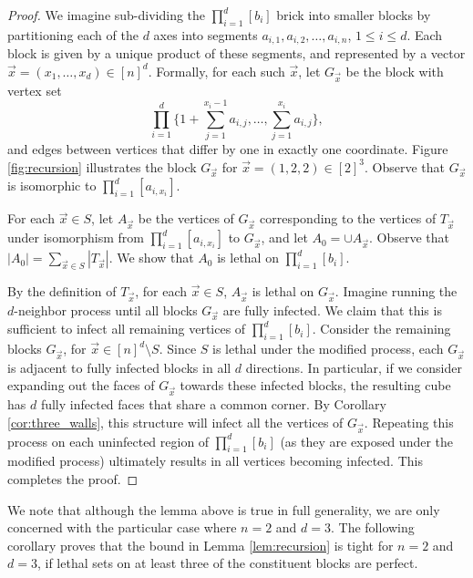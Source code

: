 \begin{proof}
We imagine sub-dividing the $\prod_{i=1}^d [b_{i}]$ brick into smaller blocks by partitioning each of the $d$ axes into segments $a_{i,1}, a_{i,2}, \dots, a_{i,n}$, $1 \leq i \leq d$. Each block is given by a unique product of these segments, and represented by a vector $\vec{x} = (x_1, \dots, x_d) \in [n]^d$. Formally, for each such $\vec{x}$, let $G_{\vec{x}}$ be the block with vertex set
$$\prod_{i=1}^d \{1+ \sum_{j=1}^{x_i -1}a_{i,j}, \dots, \sum_{j=1}^{x_i}a_{i,j} \},$$
and edges between vertices that differ by one in exactly one coordinate. Figure \ref{fig:recursion} illustrates the block $G_{\vec{x}}$ for $\vec{x} = (1,2,2) \in [2]^3$. Observe that $G_{\vec{x}}$ is isomorphic to $\prod_{i=1}^d [a_{i,x_i}]$.

For each $\vec{x} \in S$, let $A_{\vec{x}}$ be the vertices of $G_{\vec{x}}$ corresponding to the vertices of $T_{\vec{x}}$ under isomorphism from $\prod_{i=1}^d [a_{i,x_i}]$ to $G_{\vec{x}}$, and let $A_0 = \cup A_{\vec{x}}$. Observe that $|A_0| = \sum_{\vec{x} \in S} |T_{\vec{x}}|$. We show that $A_0$ is lethal on $\prod_{i=1}^d [b_{i}]$.

By the definition of $T_{\vec{x}}$, for each $\vec{x} \in S$, $A_{\vec{x}}$ is lethal on $G_{\vec{x}}$. Imagine running the $d$-neighbor process until all blocks $G_{\vec{x}}$ are fully infected. We claim that this is sufficient to infect all remaining vertices of $\prod_{i=1}^d [b_{i}]$. Consider the remaining blocks $G_{\vec{x}}$, for $\vec{x} \in [n]^d \setminus S$. Since $S$ is lethal under the modified process, each $G_{\vec{x}}$ is adjacent to fully infected blocks in all $d$ directions. In particular, if we consider expanding out the faces of $G_{\vec{x}}$ towards these infected blocks, the resulting cube has $d$ fully infected faces that share a common corner. By Corollary \ref{cor:three_walls}, this structure will infect all the vertices of $G_{\vec{x}}$. Repeating this process on each uninfected region of $\prod_{i=1}^d [b_{i}]$ (as they are exposed under the modified process) ultimately results in all vertices becoming infected. This completes the proof. 
\end{proof}

We note that although the lemma above is true in full generality, we are only concerned with the particular case where $n=2$ and $d=3$. The following corollary proves that the bound in Lemma \ref{lem:recursion} is tight for $n=2$ and $d=3$, if lethal sets on at least three of the constituent blocks are perfect. 

